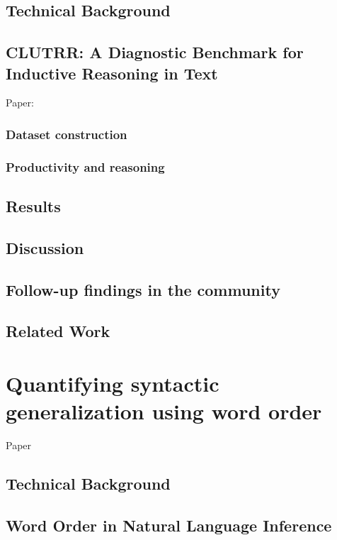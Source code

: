 \documentclass[letterpaper, 12pt]{report}
\begin{document}
\chapter{Technical Background}
\label{sec:org10c5fec}
\chapter{CLUTRR: A Diagnostic Benchmark for Inductive Reasoning in Text}
\label{sec:org8609c5a}

Paper: \cite{sinha2019a}

\section{Dataset construction}
\label{sec:orgf581075}
\section{Productivity and reasoning}
\label{sec:orgbb2ea61}
\chapter{Results}
\label{sec:org555851f}
\chapter{Discussion}
\label{sec:org4b2a7cb}
\chapter{Follow-up findings in the community}
\label{sec:org2bf2420}
\chapter{Related Work}
\label{sec:orgc3b8019}
\clearpage
\part{Quantifying syntactic generalization using word order}
\label{sec:org3c395f8}

Paper \cite{sinha2021a}

\chapter{Technical Background}
\label{sec:orgb1e99cb}
\chapter{Word Order in Natural Language Inference}
\label{sec:orgd0c45b6}
\end{document}
